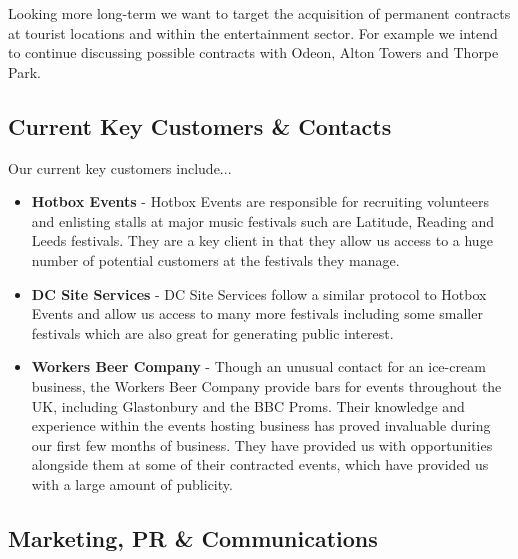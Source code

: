 \documentclass{article}
\begin{document}
  Looking more long-term we want to target the acquisition of permanent contracts at tourist locations and within the entertainment sector. For example we intend to continue discussing possible contracts with Odeon, Alton Towers and Thorpe Park.

  \subsection{Current Key Customers \& Contacts}

  Our current key customers include...
  \begin{itemize}

  \item {\bf Hotbox Events} - Hotbox Events are responsible for recruiting volunteers and enlisting stalls at major music festivals such are Latitude, Reading and Leeds festivals. They are a key client in that they allow us access to a huge number of potential customers at the festivals they manage.

  \item {\bf DC Site Services} - DC Site Services follow a similar protocol to Hotbox Events and allow us access to many more festivals including some smaller festivals which are also great for generating public interest.

  \item {\bf Workers Beer Company} - Though an unusual contact for an ice-cream business, the Workers Beer Company provide bars for events throughout the UK, including Glastonbury and the BBC Proms. Their knowledge and experience within the events hosting business has proved invaluable during our first few months of business. They have provided us with opportunities alongside them at some of their contracted events, which have provided us with a large amount of publicity.

  \end{itemize}

  \subsection{Marketing, PR \& Communications}
\end{document}
